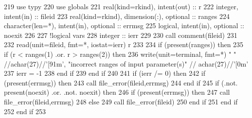 \begin{DoxyCode}
219       \textcolor{keywordtype}{use }typy
220       \textcolor{keywordtype}{use }globals
221       \textcolor{keywordtype}{real(kind=rkind)}, \textcolor{keywordtype}{intent(out)} :: r
222       \textcolor{keywordtype}{integer}, \textcolor{keywordtype}{intent(in)} :: fileid
223       \textcolor{keywordtype}{real(kind=rkind)}, \textcolor{keywordtype}{dimension(:)}, \textcolor{keywordtype}{optional} :: ranges
224       \textcolor{keywordtype}{character(len=*)}, \textcolor{keywordtype}{intent(in)}, \textcolor{keywordtype}{optional} :: errmsg
225       \textcolor{keywordtype}{logical}, \textcolor{keywordtype}{intent(in)}, \textcolor{keywordtype}{optional} :: noexit
226       
227       \textcolor{comment}{!logical vars}
228       \textcolor{keywordtype}{integer} :: ierr
229       
230       \textcolor{keyword}{call }comment(fileid)
231       
232       \textcolor{keyword}{read}(unit=fileid, fmt=*, iostat=ierr) r
233       
234       \textcolor{keywordflow}{if} (\textcolor{keyword}{present}(ranges)) \textcolor{keywordflow}{then}
235         \textcolor{keywordflow}{if} (r < ranges(1) .or. r > ranges(2)) \textcolor{keywordflow}{then}
236           \textcolor{keyword}{write}(unit=terminal, fmt=*) \textcolor{stringliteral}{" "} //achar(27)//\textcolor{stringliteral}{'[91m'}, \textcolor{stringliteral}{"incorrect ranges of input parameter(s)"}\textcolor{comment}{ //
      achar(27)//}\textcolor{stringliteral}{'[0m'}
237           ierr = -1
238 \textcolor{keywordflow}{        end if}
239 \textcolor{keywordflow}{      end if}
240       
241       \textcolor{keywordflow}{if} (ierr /= 0) \textcolor{keywordflow}{then}
242         \textcolor{keywordflow}{if} (\textcolor{keyword}{present}(errmsg)) \textcolor{keywordflow}{then}
243           \textcolor{keyword}{call }file_error(fileid,errmsg)
244 \textcolor{keywordflow}{        end if}
245         \textcolor{keywordflow}{if} (.not. \textcolor{keyword}{present}(noexit) .or. .not. noexit) \textcolor{keywordflow}{then}
246           \textcolor{keywordflow}{if} (\textcolor{keyword}{present}(errmsg)) \textcolor{keywordflow}{then}
247             \textcolor{keyword}{call }file_error(fileid,errmsg)
248           \textcolor{keywordflow}{else}
249             \textcolor{keyword}{call }file_error(fileid)
250 \textcolor{keywordflow}{          end if}
251 \textcolor{keywordflow}{        end if}
252 \textcolor{keywordflow}{      end if}
253 
\end{DoxyCode}
